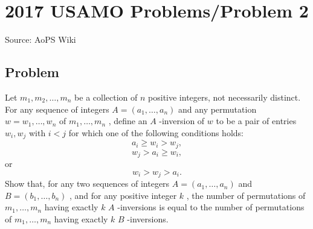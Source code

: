 \documentclass[12pt]{article}
\begin{document}
\section*{{2017 USAMO Problems/Problem 2}}
Source: AoPS Wiki

\subsection*{Problem}
Let $m_1, m_2, \ldots, m_n$ be a collection of $n$ positive integers, not necessarily distinct. For any sequence of integers $A = (a_1, \ldots, a_n)$ and any permutation $w = w_1, \ldots, w_n$ of $m_1, \ldots, m_n$ , define an $A$ -inversion of $w$ to be a pair of entries $w_i, w_j$ with $i < j$ for which one of the following conditions holds: \[a_i \ge w_i > w_j,\] \[w_j > a_i \ge w_i,\] or \[w_i > w_j > a_i.\] Show that, for any two sequences of integers $A = (a_1, \ldots, a_n)$ and $B = (b_1, \ldots, b_n)$ , and for any positive integer $k$ , the number of permutations of $m_1, \ldots, m_n$ having exactly $k$ $A$ -inversions is equal to the number of permutations of $m_1, \ldots, m_n$ having exactly $k$ $B$ -inversions.
\end{document}
